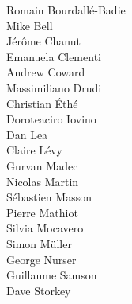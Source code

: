  Romain Bourdall\'{e}-Badie  \\
                            Mike Bell                   \\
                            J\'{e}r\^{o}me Chanut       \\
 Emanuela Clementi           \\
 Andrew Coward               \\
 Massimiliano Drudi          \\
                            Christian \'{E}th\'{e}      \\
 Doroteaciro Iovino          \\
                            Dan Lea                     \\
 Claire L\'{e}vy             \\
 Gurvan Madec                \\
                            Nicolas Martin              \\
 S\'{e}bastien Masson        \\
                            Pierre Mathiot              \\
 Silvia Mocavero             \\
                            Simon M\"{u}ller            \\
                            George Nurser               \\
 Guillaume Samson            \\
                            Dave Storkey                \\
